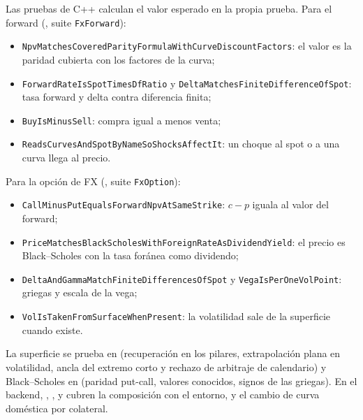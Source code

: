 Las pruebas de C++ calculan el valor esperado en la propia prueba. Para el forward
(, suite \texttt{FxForward}):
\begin{itemize}
  \item \texttt{NpvMatchesCoveredParityFormulaWithCurveDiscountFactors}: el valor es la paridad cubierta con los factores de la curva;
  \item \texttt{ForwardRateIsSpotTimesDfRatio} y \texttt{DeltaMatchesFiniteDifferenceOfSpot}: tasa forward y delta contra diferencia finita;
  \item \texttt{BuyIsMinusSell}: compra igual a menos venta;
  \item \texttt{ReadsCurvesAndSpotByNameSoShocksAffectIt}: un choque al spot o a una curva llega al precio.
\end{itemize}
Para la opción de FX (, suite \texttt{FxOption}):
\begin{itemize}
  \item \texttt{CallMinusPutEqualsForwardNpvAtSameStrike}: $c-p$ iguala al valor del forward;
  \item \texttt{PriceMatchesBlackScholesWithForeignRateAsDividendYield}: el precio es Black--Scholes con la tasa foránea como dividendo;
  \item \texttt{DeltaAndGammaMatchFiniteDifferencesOfSpot} y \texttt{VegaIsPerOneVolPoint}: griegas y escala de la vega;
  \item \texttt{VolIsTakenFromSurfaceWhenPresent}: la volatilidad sale de la superficie cuando existe.
\end{itemize}
La superficie se prueba en  (recuperación en los pilares,
extrapolación plana en volatilidad, ancla del extremo corto y rechazo de arbitraje de calendario) y
Black--Scholes en  (paridad put-call, valores conocidos, signos
de las griegas). En el backend,
,
,
 y
 cubren la composición con el
entorno, y 
el cambio de curva doméstica por colateral.

